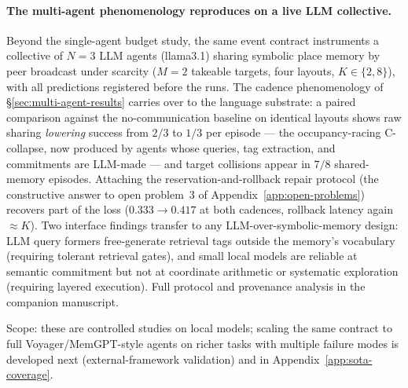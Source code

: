 \documentclass{article}
\begin{document}
\paragraph{The multi-agent phenomenology reproduces on a live LLM collective.}
Beyond the single-agent budget study, the same event contract
instruments a collective of $N{=}3$ LLM agents (llama3.1) sharing
symbolic place memory by peer broadcast under scarcity ($M{=}2$
takeable targets, four layouts, $K\in\{2,8\}$), with all predictions
registered before the runs. The cadence phenomenology of
\S\ref{sec:multi-agent-results} carries over to the language
substrate: a paired comparison against the no-communication baseline
on identical layouts shows raw sharing \emph{lowering} success from
$2/3$ to $1/3$ per episode --- the occupancy-racing C-collapse, now
produced by agents whose queries, tag extraction, and commitments are
LLM-made --- and target collisions appear in $7/8$ shared-memory
episodes. Attaching the reservation-and-rollback repair protocol (the
constructive answer to open problem~3 of
Appendix~\ref{app:open-problems}) recovers part of the loss
($0.333\to0.417$ at both cadences, rollback latency again
${\approx}K$). Two interface findings transfer to any
LLM-over-symbolic-memory design: LLM query formers free-generate
retrieval tags outside the memory's vocabulary (requiring tolerant
retrieval gates), and small local models are reliable at semantic
commitment but not at coordinate arithmetic or systematic exploration
(requiring layered execution). Full protocol and provenance analysis
in the companion manuscript.

Scope: these are controlled studies on local models; scaling the same contract to full Voyager/MemGPT-style agents on richer tasks with multiple failure modes is developed next (external-framework validation) and in Appendix~\ref{app:sota-coverage}.
\end{document}
